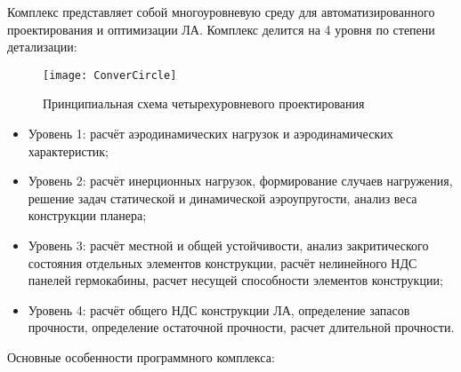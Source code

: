 \label{sec:Conver}


Комплекс представляет собой многоуровневую среду для автоматизированного проектирования и оптимизации ЛА. Комплекс делится на 4 уровня по степени детализации:



\begin{figure}[ht]
\centering
\texttt{[image: ConverCircle]} 
\caption{Принципиальная схема четырехуровневого проектирования}
\end{figure}



\begin{itemize}
\item Уровень 1: расчёт аэродинамических нагрузок и аэродинамических характеристик; 
\item Уровень 2: расчёт инерционных нагрузок, формирование случаев нагружения, решение задач статической и динамической аэроупругости, анализ веса конструкции планера;
\item Уровень 3: расчёт местной и общей устойчивости, анализ закритического состояния отдельных элементов конструкции, расчёт нелинейного НДС панелей гермокабины, расчет несущей способности элементов конструкции;
\item Уровень 4: расчёт общего НДС конструкции ЛА, определение запасов прочности, определение остаточной прочности, расчет длительной прочности.
\end{itemize}

Основные особенности программного комплекса:

